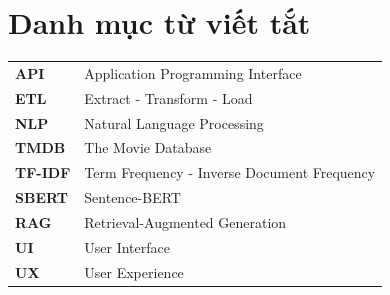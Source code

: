 \chapter*{Danh mục từ viết tắt}

\begin{longtable}{p{3cm}p{10cm}}
\textbf{API} & Application Programming Interface \\
\textbf{ETL} & Extract - Transform - Load \\
\textbf{NLP} & Natural Language Processing \\
\textbf{TMDB} & The Movie Database \\
\textbf{TF-IDF} & Term Frequency - Inverse Document Frequency \\
\textbf{SBERT} & Sentence-BERT \\
\textbf{RAG} & Retrieval-Augmented Generation \\
\textbf{UI} & User Interface \\
\textbf{UX} & User Experience \\
\end{longtable}
